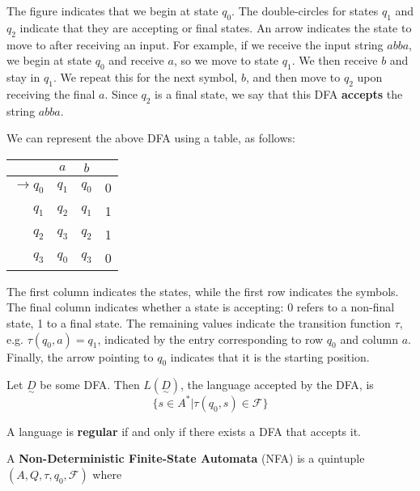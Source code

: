 The figure indicates that we begin at state $q_0$. The double-circles for states $q_1$ and $q_2$ indicate that they are accepting or final states. An arrow indicates the state to move to after receiving an input. For example, if we receive the input string $abba$, we begin at state $q_0$ and receive $a$, so we move to state $q_1$. We then receive $b$ and stay in $q_1$. We repeat this for the next symbol, $b$, and then move to $q_2$ upon receiving the final $a$. Since $q_2$ is a final state, we say that this DFA \textbf{accepts} the string $abba$. 

We can represent the above DFA using a table, as follows:

\begin{center}\begin{tabular}{r|c c r}
         & $a$ & $b$ & \\\hline
    $\to q_0$ & $q_1$ & $q_0$ & 0 \\
    $q_1$ & $q_2$ & $q_1$ & 1 \\
    $q_2$ & $q_3$ & $q_2$ & 1\\
    $q_3$ & $q_0$ & $q_3$ & 0\\
\end{tabular}\end{center}

The first column indicates the states, while the first row indicates the symbols. The final column indicates whether a state is accepting: 0 refers to a non-final state, 1 to a final state. The remaining values indicate the transition function $\tau$, e.g. $\tau(q_0, a)=q_1$, indicated by the entry corresponding to row $q_0$ and column $a$. Finally, the arrow pointing to $q_0$ indicates that it is the starting position. 

\begin{definition}
Let $\underset{\sim}{D}$ be some DFA. Then $L(\underset{\sim}{D})$, the language accepted by the DFA, is \[\{s\in A^*|\tau(q_0, s)\in \mathcal{F}\}\]
\end{definition}

\begin{definition}
A language is \textbf{regular} if and only if there exists a DFA that accepts it.
\end{definition}

\begin{definition}
A \textbf{Non-Deterministic Finite-State Automata} (NFA) is a quintuple $(A, Q, \tau, q_0, \mathcal{F})$ where 
\end{definition}

